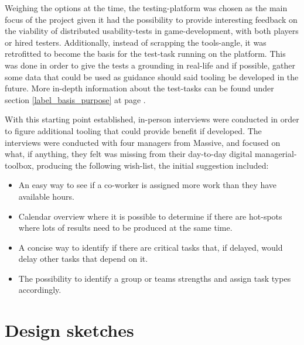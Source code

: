 {Weighing the options at the time, the testing-platform was chosen as the main
focus of the project given it had the possibility to provide interesting
feedback on the viability of distributed usability-tests in game-development,
with both players or hired testers. Additionally, instead of scrapping the
tools-angle, it was retrofitted to become the basis for the test-task running
on the platform. This was done in order to give the tests a grounding in
real-life and if possible, gather some data that could be used as guidance
should said tooling be developed in the future. More in-depth information about
the test-tasks can be found under section \ref{label_basis_purpose} at page
\pageref{label_basis_purpose}.

With this starting point established, in-person interviews were conducted
in order to figure additional tooling that could provide benefit if developed.
The interviews were conducted with four managers from Massive, and focused on
what, if anything, they felt was missing from their day-to-day digital
managerial-toolbox, producing the following wish-list, the initial
suggestion included:


  \newcommand{\ideaOne}{%
    An easy way to see if a co-worker is assigned more work than they have
    available hours.%
  }

  \newcommand{\ideaTwo}{%
    Calendar overview where it is possible to determine if there are
    hot-spots where lots of results need to be produced at the same
    time.%
  }

  \newcommand{\ideaThree}{%
    A concise way to identify if there are critical tasks that, if
    delayed, would delay other tasks that depend on it.%
  }

  \newcommand{\ideaFour}{%
    The possibility to identify a group or teams strengths and assign
    task types accordingly.%
  }

  \begin{itemize}
    \item{\ideaOne\label{label_ideas}}
    \item{\ideaTwo}
    \item{\ideaThree}
    \item{\ideaFour}
  \end{itemize}

\section{Design sketches}

%
%
%

}
